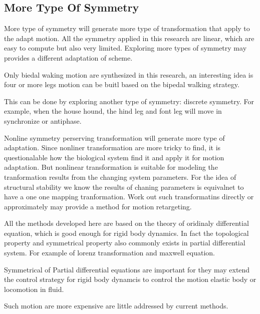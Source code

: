 \subsection{More Type Of Symmetry}
More type of symmetry will generate more type of transformation that apply to the adapt motion.
All the symmetry applied in this research are linear, which are easy to compute but also very limited.
Exploring more types of symmetry may provides a different adaptation of scheme.
\begin{itemize}

Only biedal waking motion are synthesized in this research, an interesting idea is four or more legs motion can be buitl based on the bipedal walking strategy.

This can be done by exploring another type of symmetry: discrete symmetry.
For  example, when the house hound, the hind leg and font leg will move in synchronize or antiphase.




Nonline symmetry perserving transformation will generate more type of adaptation.
Since nonliner transformation are more tricky to find, it is questionalable how the biological system find it and apply it for motion adaptation.
But nonlinear transformation is suitable for modeling the tranformation  results from the changing system parameters.
For the idea of structural stability we know the results of chaning parameters is equivalnet to have a one one mapping tranformation.
Work out such transformatins directly or approximately may provide a method for motion retargeting.


All the methods developed here are based on the theory of oridinaly differential equation, which is good enough for rigid body dynamics.
In fact the topological property and symmetrical property also commonly exists in partial differential system.
For example of lorenz transformation and maxwell equation.

Symmetrical of Partial differential equations are important for they may extend the control strategy for rigid body dynamcis to control the motion elastic body or locomotion in fluid.

Such motion are more expensive are little addressed by current \cms methods.


\end{itemize}

